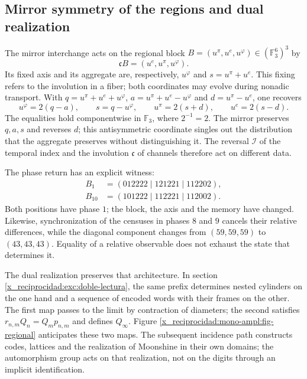 \subsection{Mirror symmetry of the regions and dual realization}
\label{x_reciprocidad:mono-ampl:regiones}

The mirror interchange acts on the regional block
\(B=(u^\pi,u^e,u^\varphi)\in(\mathbb F_3^6)^3\) by
\[
 \mathfrak cB=(u^e,u^\pi,u^\varphi).
\]
Its fixed axis and its aggregate are, respectively, \(u^\varphi\) and
\(s=u^\pi+u^e\). This fixing refers to the involution in a fiber;
both coordinates may evolve during nonadic transport.
With \(q=u^\pi+u^e+u^\varphi\),
\(a=u^\pi+u^e-u^\varphi\) and \(d=u^\pi-u^e\), one recovers
\[
 u^\varphi=2(q-a),\qquad s=q-u^\varphi,\qquad
 u^\pi=2(s+d),\qquad u^e=2(s-d).
\]
The equalities hold componentwise in \(\mathbb F_3\), where
\(2^{-1}=2\). The mirror preserves \(q,a,s\) and reverses \(d\); this
antisymmetric coordinate singles out the distribution that the aggregate preserves
without distinguishing it. The reversal \(\mathcal I\) of the temporal index and the
involution \(\mathfrak c\) of channels therefore act on
different data.

The phase return has an explicit witness:
\[
 \begin{aligned}
 B_1&=(012222\mid121221\mid112202),\\
 B_{10}&=(101222\mid112221\mid112002).
 \end{aligned}
\]
Both positions have phase \(1\); the block, the axis and the memory have
changed. Likewise, synchronization of the censuses in phases \(8\) and
\(9\) cancels their relative differences, while the diagonal component
changes from \((59,59,59)\) to \((43,43,43)\). Equality of a relative
observable does not exhaust the state that determines it.

The dual realization preserves that architecture. In section
\ref{x_reciprocidad:exc:doble-lectura}, the same prefix determines nested
cylinders on the one hand and a sequence of encoded words with their frames on the other.
The first map passes to the limit by contraction of diameters; the second
satisfies \(r_{n,m}Q_n=Q_mp_{n,m}\) and defines \(Q_\infty\).
Figure \ref{x_reciprocidad:mono-ampl:fig-regional} anticipates these two maps.
The subsequent incidence path constructs codes, lattices and the
realization of Moonshine in their own domains; the automorphism group
acts on that realization, not on the digits through an implicit
identification.


